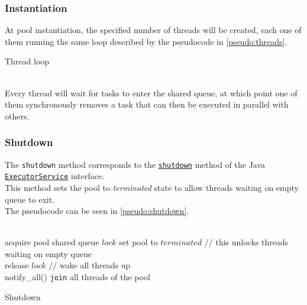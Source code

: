 \documentclass[10pt,twocolumn,letterpaper]{article}
\begin{document}
	\subsubsection{Instantiation}
	At pool instantiation, the specified number of threads will be created, each one of them running the same loop described by the pseudocode in \cref{pseudo:threads}.
	\begin{algorithm}
		\SetAlgoLined
		\caption{Thread loop}
		\label{pseudo:threads}
	\end{algorithm}\\
	Every thread will wait for tasks to enter the shared queue, at which point one of them synchronously removes a task that can then be executed in parallel with others.
	\pagebreak
	\subsubsection{Shutdown}
	The \lstinline|shutdown| method corresponds to the  \href{https://docs.oracle.com/javase/7/docs/api/java/util/concurrent/ExecutorService.html#shutdown()}{\lstinline{shutdown}} method of the Java  \href{https://docs.oracle.com/javase/7/docs/api/java/util/concurrent/ExecutorService.html}{\lstinline{ExecutorService}} interface.\\
	This method sets the pool to \textit{terminated} state to allow threads waiting on empty queue to exit.\\
	The pseudocode can be seen in \cref{pseudo:shutdown}.\\\\
	\begin{algorithm}
		\SetAlgoLined
		acquire pool shared queue $lock$\;
		set pool to $terminated$\;
		// this unlocks threads waiting on empty queue\\
		release $lock$\;
		// wake all threads up\\
		notify\_all()\;
		\lstinline|join| all threads of the pool\;
		\caption{Shutdown}
		\label{pseudo:shutdown}
	\end{algorithm}
	\pagebreak
\end{document}
